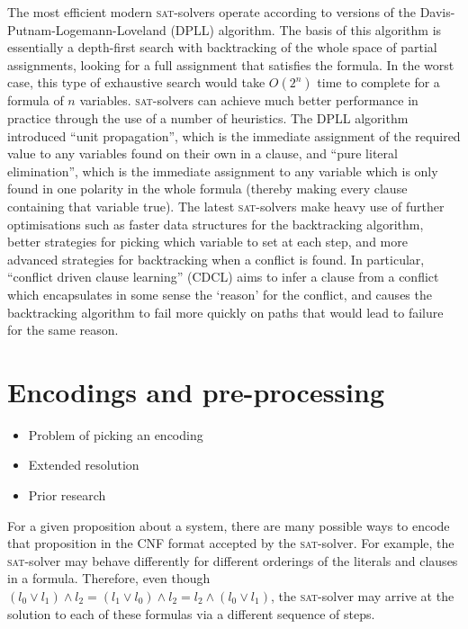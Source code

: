 \documentclass[11pt]{article}
\begin{document}
The most efficient modern \textsc{sat}-solvers operate according to versions of the Davis-Putnam-Logemann-Loveland (DPLL) algorithm. The basis of this algorithm is essentially a depth-first search with backtracking of the whole space of partial assignments, looking for a full assignment that satisfies the formula. In the worst case, this type of exhaustive search would take $O(2^n)$ time to complete for a formula of $n$ variables. \textsc{sat}-solvers can achieve much better performance in practice through the use of a number of heuristics. The DPLL algorithm introduced ``unit propagation'', which is the immediate assignment of the required value to any variables found on their own in a clause, and ``pure literal elimination'', which is the immediate assignment to any variable which is only found in one polarity in the whole formula (thereby making every clause containing that variable true). The latest \textsc{sat}-solvers make heavy use of further optimisations such as faster data structures for the backtracking algorithm, better strategies for picking which variable to set at each step, and more advanced strategies for backtracking when a conflict is found. In particular, ``conflict driven clause learning'' (CDCL) aims to infer a clause from a conflict which encapsulates in some sense the `reason' for the conflict, and causes the backtracking algorithm to fail more quickly on paths that would lead to failure for the same reason.

\section{Encodings and pre-processing}

\begin{itemize}
  \item Problem of picking an encoding
  \item Extended resolution
  \item Prior research
\end{itemize}

For a given proposition about a system, there are many possible ways to encode that proposition in the CNF format accepted by the \textsc{sat}-solver. For example, the \textsc{sat}-solver may behave differently for different orderings of the literals and clauses in a formula. Therefore, even though $(l_0 \vee l_1) \wedge l_2 = (l_1 \vee l_0) \wedge l_2 = l_2 \wedge (l_0 \vee l_1)$, the \textsc{sat}-solver may arrive at the solution to each of these formulas via a different sequence of steps.
\end{document}
